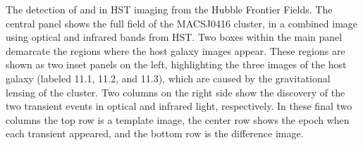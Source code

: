 \label{fig:SpockDetectionImages}
The detection of \spockone and \spocktwo in HST imaging from the
Hubble Frontier Fields. The central panel shows the full field of the
MACSJ0416 cluster, in a combined image using optical and infrared
bands from HST.  Two boxes within the main panel demarcate the regions
where the \spock host galaxy images appear. These regions are shown as
two inset panels on the left, highlighting the three images of the
host galaxy (labeled 11.1, 11.2, and 11.3), which are caused by the
gravitational lensing of the cluster.  Two columns on the right side
show the discovery of the two transient events in optical and infrared
light, respectively.  In these final two columns the top row is a
template image, the center row shows the epoch when each transient
appeared, and the bottom row is the difference image.
